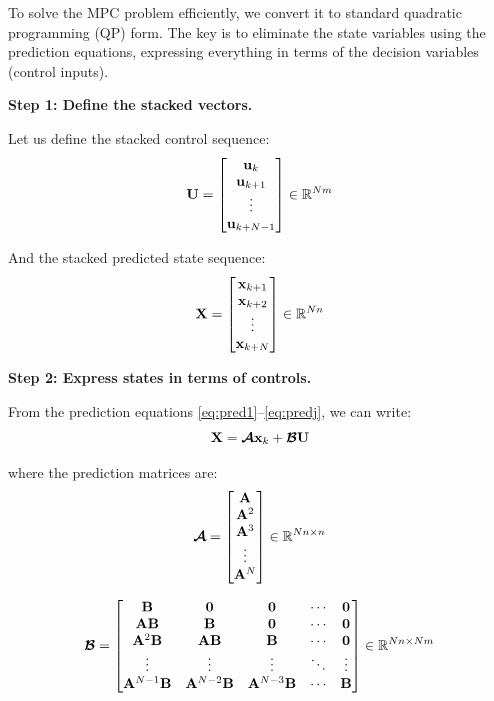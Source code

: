 To solve the MPC problem efficiently, we convert it to standard quadratic programming (QP) form. The key is to eliminate the state variables using the prediction equations, expressing everything in terms of the decision variables (control inputs).

\textbf{Step 1: Define the stacked vectors.}

Let us define the stacked control sequence:
\begin{equation}
    \mathbf{U} = \begin{bmatrix} \mathbf{u}_k \\ \mathbf{u}_{k+1} \\ \vdots \\ \mathbf{u}_{k+N-1} \end{bmatrix} \in \mathbb{R}^{Nm}
\end{equation}

And the stacked predicted state sequence:
\begin{equation}
    \mathbf{X} = \begin{bmatrix} \mathbf{x}_{k+1} \\ \mathbf{x}_{k+2} \\ \vdots \\ \mathbf{x}_{k+N} \end{bmatrix} \in \mathbb{R}^{Nn}
\end{equation}

\textbf{Step 2: Express states in terms of controls.}

From the prediction equations \eqref{eq:pred1}--\eqref{eq:predj}, we can write:
\begin{equation}
    \mathbf{X} = \boldsymbol{\mathcal{A}} \mathbf{x}_k + \boldsymbol{\mathcal{B}} \mathbf{U}
\label{eq:stacked_prediction}
\end{equation}

where the prediction matrices are:
\begin{equation}
    \boldsymbol{\mathcal{A}} = \begin{bmatrix} \mathbf{A} \\ \mathbf{A}^2 \\ \mathbf{A}^3 \\ \vdots \\ \mathbf{A}^N \end{bmatrix} \in \mathbb{R}^{Nn \times n}
\end{equation}

\begin{equation}
    \boldsymbol{\mathcal{B}} = \begin{bmatrix}
        \mathbf{B} & \mathbf{0} & \mathbf{0} & \cdots & \mathbf{0} \\
        \mathbf{A}\mathbf{B} & \mathbf{B} & \mathbf{0} & \cdots & \mathbf{0} \\
        \mathbf{A}^2\mathbf{B} & \mathbf{A}\mathbf{B} & \mathbf{B} & \cdots & \mathbf{0} \\
        \vdots & \vdots & \vdots & \ddots & \vdots \\
        \mathbf{A}^{N-1}\mathbf{B} & \mathbf{A}^{N-2}\mathbf{B} & \mathbf{A}^{N-3}\mathbf{B} & \cdots & \mathbf{B}
    \end{bmatrix} \in \mathbb{R}^{Nn \times Nm}
\end{equation}

